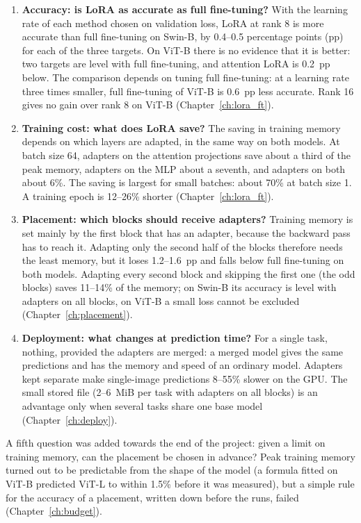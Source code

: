 \begin{enumerate}
  \item \textbf{Accuracy: is LoRA as accurate as full fine-tuning?} With the learning rate of each method chosen on
        validation loss, LoRA at rank 8 is more accurate than full fine-tuning on Swin-B, by 0.4--0.5 percentage
        points (pp) for each of the three targets. On ViT-B there is no evidence that it is better: two targets are level with
        full fine-tuning, and attention LoRA is 0.2~pp below. The comparison depends on tuning full fine-tuning: at a learning rate three
        times smaller, full fine-tuning of ViT-B is 0.6~pp less accurate. Rank 16 gives no gain over rank 8 on
        ViT-B (Chapter~\ref{ch:lora_ft}).
  \item \textbf{Training cost: what does LoRA save?} The saving in training memory depends on which layers are
        adapted, in the same way on both models. At batch size 64, adapters on the attention projections save
        about a third of the peak memory, adapters on the MLP about a seventh, and adapters on both about 6\%. The
        saving is largest for small batches: about 70\% at batch size 1. A training epoch is 12--26\% shorter
        (Chapter~\ref{ch:lora_ft}).
  \item \textbf{Placement: which blocks should receive adapters?} Training memory is set mainly by the first block
        that has an adapter, because the backward pass has to reach it. Adapting only the second half of the blocks
        therefore needs the least memory, but it loses 1.2--1.6~pp and falls below full fine-tuning on both models.
        Adapting every second block and skipping the first one (the odd blocks) saves 11--14\% of the memory; on Swin-B
        its accuracy is level with adapters on all blocks, on ViT-B a small loss cannot be excluded (Chapter~\ref{ch:placement}).
  \item \textbf{Deployment: what changes at prediction time?} For a single task, nothing, provided the adapters are
        merged: a merged model gives the same predictions and has the memory and speed of an ordinary model.
        Adapters kept separate make single-image predictions 8--55\% slower on the GPU. The small stored file
        (2--6~MiB per task with adapters on all blocks) is an advantage only when several tasks share one base model
        (Chapter~\ref{ch:deploy}).
\end{enumerate}
A fifth question was added towards the end of the project: given a limit on training memory, can the placement be
chosen in advance? Peak training memory turned out to be predictable from the shape of the model (a formula fitted
on ViT-B predicted ViT-L to within 1.5\% before it was measured), but a simple rule for the accuracy of a
placement, written down before the runs, failed (Chapter~\ref{ch:budget}).

